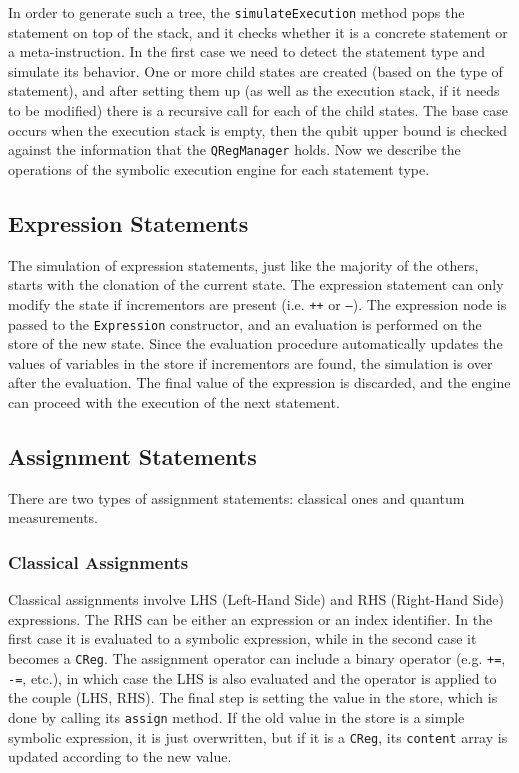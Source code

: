 \documentclass[12pt,a4paper]{report}
\theoremstyle{definition}
\theoremstyle{definition}
\theoremstyle{definition}
\begin{document}
In order to generate such a tree, the \texttt{simulateExecution} method pops the statement on top of the stack, and it checks whether it is a concrete statement or a meta-instruction. In the first case we need to detect the statement type and simulate its behavior. One or more child states are created (based on the type of statement), and after setting them up (as well as the execution stack, if it needs to be modified) there is a recursive call for each of the child states. The base case occurs when the execution stack is empty, then the qubit upper bound is checked against the information that the \texttt{QRegManager} holds.
Now we describe the operations of the symbolic execution engine for each statement type.

\subsection{Expression Statements}
The simulation of expression statements, just like the majority of the others, starts with the clonation of the current state. The expression statement can only modify the state if incrementors are present (i.e. \texttt{++} or \texttt{--}). The expression node is passed to the \texttt{Expression} constructor, and an evaluation is performed on the store of the new state. Since the evaluation procedure automatically updates the values of variables in the store if incrementors are found, the simulation is over after the evaluation. The final value of the expression is discarded, and the engine can proceed with the execution of the next statement.
\subsection{Assignment Statements}
There are two types of assignment statements: classical ones and quantum measurements.
\subsubsection{Classical Assignments}
Classical assignments involve LHS (Left-Hand Side) and RHS (Right-Hand Side) expressions. The RHS can be either an expression or an index identifier. In the first case it is evaluated to a symbolic expression, while in the second case it becomes a \texttt{CReg}. The assignment operator can include a binary operator (e.g. \texttt{+=}, \texttt{-=}, etc.), in which case the LHS is also evaluated and the operator is applied to the couple (LHS, RHS).
The final step is setting the value in the store, which is done by calling its \texttt{assign} method. If the old value in the store is a simple symbolic expression, it is just overwritten, but if it is a \texttt{CReg}, its \texttt{content} array is updated according to the new value.
\end{document}
